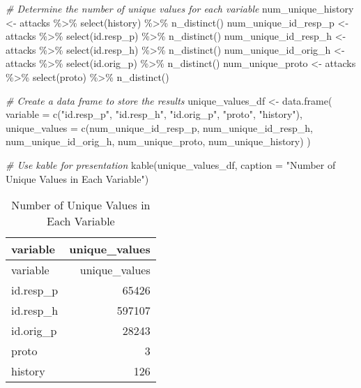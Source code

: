 \documentclass[
]{article}
\newenvironment{Shaded}{\begin{snugshade}}{\end{snugshade}}
\newcommand{\AttributeTok}[1]{\textcolor[rgb]{0.77,0.63,0.00}{#1}}
\newcommand{\CommentTok}[1]{\textcolor[rgb]{0.56,0.35,0.01}{\textit{#1}}}
\newcommand{\FunctionTok}[1]{\textcolor[rgb]{0.00,0.00,0.00}{#1}}
\newcommand{\NormalTok}[1]{#1}
\newcommand{\OtherTok}[1]{\textcolor[rgb]{0.56,0.35,0.01}{#1}}
\newcommand{\SpecialCharTok}[1]{\textcolor[rgb]{0.00,0.00,0.00}{#1}}
\newcommand{\StringTok}[1]{\textcolor[rgb]{0.31,0.60,0.02}{#1}}
\begin{document}
\begin{Shaded}
\begin{Highlighting}[]
\CommentTok{\# Determine the number of unique values for each variable}
\NormalTok{num\_unique\_history }\OtherTok{\textless{}{-}}\NormalTok{ attacks }\SpecialCharTok{\%\textgreater{}\%} \FunctionTok{select}\NormalTok{(history) }\SpecialCharTok{\%\textgreater{}\%} \FunctionTok{n\_distinct}\NormalTok{()}
\NormalTok{num\_unique\_id\_resp\_p }\OtherTok{\textless{}{-}}\NormalTok{ attacks }\SpecialCharTok{\%\textgreater{}\%} \FunctionTok{select}\NormalTok{(id.resp\_p) }\SpecialCharTok{\%\textgreater{}\%} \FunctionTok{n\_distinct}\NormalTok{()}
\NormalTok{num\_unique\_id\_resp\_h }\OtherTok{\textless{}{-}}\NormalTok{ attacks }\SpecialCharTok{\%\textgreater{}\%} \FunctionTok{select}\NormalTok{(id.resp\_h) }\SpecialCharTok{\%\textgreater{}\%} \FunctionTok{n\_distinct}\NormalTok{()}
\NormalTok{num\_unique\_id\_orig\_h }\OtherTok{\textless{}{-}}\NormalTok{ attacks }\SpecialCharTok{\%\textgreater{}\%} \FunctionTok{select}\NormalTok{(id.orig\_p) }\SpecialCharTok{\%\textgreater{}\%} \FunctionTok{n\_distinct}\NormalTok{()}
\NormalTok{num\_unique\_proto }\OtherTok{\textless{}{-}}\NormalTok{ attacks }\SpecialCharTok{\%\textgreater{}\%} \FunctionTok{select}\NormalTok{(proto) }\SpecialCharTok{\%\textgreater{}\%} \FunctionTok{n\_distinct}\NormalTok{()}

\CommentTok{\# Create a data frame to store the results}
\NormalTok{unique\_values\_df }\OtherTok{\textless{}{-}} \FunctionTok{data.frame}\NormalTok{(}
  \AttributeTok{variable =} \FunctionTok{c}\NormalTok{(}\StringTok{"id.resp\_p"}\NormalTok{, }\StringTok{"id.resp\_h"}\NormalTok{, }\StringTok{"id.orig\_p"}\NormalTok{, }\StringTok{"proto"}\NormalTok{, }\StringTok{"history"}\NormalTok{),}
  \AttributeTok{unique\_values =} \FunctionTok{c}\NormalTok{(num\_unique\_id\_resp\_p, num\_unique\_id\_resp\_h, num\_unique\_id\_orig\_h, num\_unique\_proto, num\_unique\_history)}
\NormalTok{)}

\CommentTok{\# Use kable for presentation}
\FunctionTok{kable}\NormalTok{(unique\_values\_df, }\AttributeTok{caption =} \StringTok{"Number of Unique Values in Each Variable"}\NormalTok{)}
\end{Highlighting}
\end{Shaded}

\begin{longtable}[]{@{}lr@{}}
\caption{Number of Unique Values in Each Variable}\tabularnewline
\toprule()
variable & unique\_values \\
\midrule()
\endfirsthead
\toprule()
variable & unique\_values \\
\midrule()
\endhead
id.resp\_p & 65426 \\
id.resp\_h & 597107 \\
id.orig\_p & 28243 \\
proto & 3 \\
history & 126 \\
\bottomrule()
\end{longtable}
\end{document}
